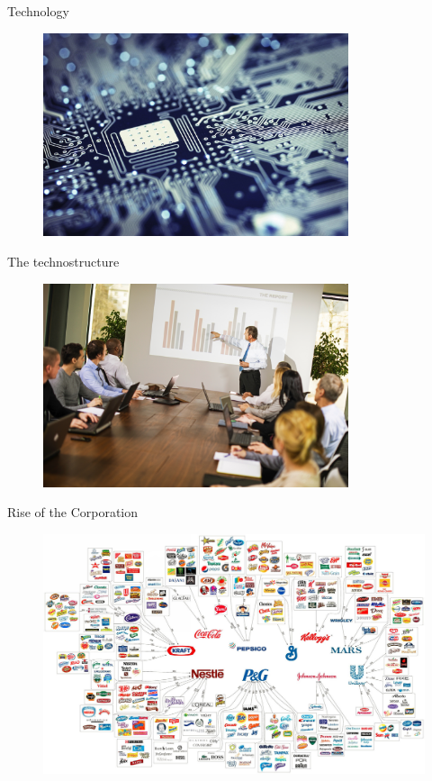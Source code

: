 \documentclass{beamer}
\begin{document}
\begin{frame}{Technology}

\begin{figure}[htpb]
	\centering
	\includegraphics[width=0.8\textwidth]{../img/tech.jpg}
	\label{fig:technology}
\end{figure}

\end{frame}{}

\begin{frame}{The technostructure}

\begin{figure}[htpb]
	\centering
	\includegraphics[width=0.8\textwidth]{../img/technostructure.jpg}
\end{figure}

\end{frame}

\begin{frame}{Rise of the Corporation}

	\begin{figure}[htpb]
		\centering
		\includegraphics[width=0.8\linewidth]{../img/megacorp.jpg}
	\end{figure}

\end{frame}
\end{document}
